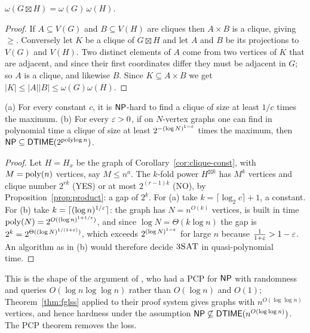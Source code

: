 \begin{proposition}\label{prop:product}
$\omega(G\boxtimes H)=\omega(G)\,\omega(H)$.
\end{proposition}
\begin{proof}
If $A\subseteq V(G)$ and $B\subseteq V(H)$ are cliques then $A\times B$ is a clique, giving $\ge$.  Conversely let $K$ be a clique of $G\boxtimes H$ and let $A$ and $B$ be its
projections to $V(G)$ and $V(H)$.  Two distinct elements of $A$ come from two vertices of $K$ that are adjacent, and since their first coordinates differ they must be adjacent in $G$; so $A$ is a clique, and likewise $B$.
Since $K\subseteq A\times B$ we get $|K|\le|A||B|\le\omega(G)\omega(H)$.
\end{proof}

\begin{corollary}\label{cor:clique-quasi}
(a) For every constant $c$, it is $\mathsf{NP}$-hard to find a clique of size at least $1/c$ times the maximum.
(b) For every $\varepsilon>0$, if on $N$-vertex graphs one can find in polynomial time a clique of size at least $2^{-(\log N)^{1-\varepsilon}}$ times the maximum, then $\mathsf{NP}\subseteq\mathsf{DTIME}(2^{\operatorname{polylog} n})$.
\end{corollary}
\begin{proof}
Let $H=H_x$ be the graph of Corollary~\ref{cor:clique-const}, with $M=\operatorname{poly}(n)$ vertices, say $M\le n^{a}$.  The $k$-fold power $H^{\boxtimes k}$ has $M^k$ vertices and clique number $2^{rk}$ (YES) or at most $2^{(r-1)k}$ (NO), by Proposition~\ref{prop:product}: a gap of $2^k$.
For (a) take $k=\lceil\log_2c\rceil+1$, a constant.  For (b) take $k=\lceil(\log n)^{1/\varepsilon}\rceil$: the graph has $N=n^{O(k)}$ vertices, is built in time $\operatorname{poly}(N)=2^{O((\log n)^{1+1/\varepsilon})}$, and since
$\log N=\Theta(k\log n)$ the gap is $2^k=2^{\Theta((\log N)^{1/(1+\varepsilon)})}$, which exceeds $2^{(\log N)^{1-\varepsilon}}$ for large $n$ because $\tfrac1{1+\varepsilon}>1-\varepsilon$.  An algorithm as in (b) would therefore decide $\textsc{3SAT}$ in quasi-polynomial time.
\end{proof}

\noindent
This is the shape of the argument of \citet{FGLSS96}, who had a PCP for $\mathsf{NP}$ with randomness and queries $O(\log n\log\log n)$ rather than $O(\log n)$ and $O(1)$; Theorem~\ref{thm:fglss}
applied to their proof system gives graphs with $n^{O(\log\log n)}$ vertices, and hence hardness under the assumption $\mathsf{NP}\not\subseteq\mathsf{DTIME}(n^{O(\log\log n)})$.  The PCP theorem removes the loss.

